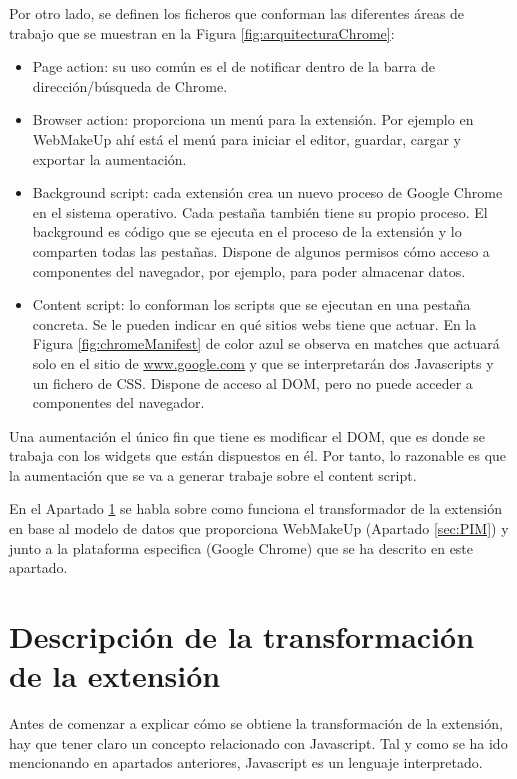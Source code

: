 Por otro lado, se definen los ficheros que conforman las diferentes áreas de trabajo que se muestran en la Figura \ref{fig:arquitecturaChrome}:
\begin{itemize}
\item{Page action: su uso común es el de notificar dentro de la barra de dirección/búsqueda de Chrome.}
\item{Browser action: proporciona un menú para la extensión. Por ejemplo en WebMakeUp ahí está el menú para iniciar el editor, guardar, cargar y exportar la aumentación.}
\item{Background script: cada extensión crea un nuevo proceso de Google Chrome en el sistema operativo. Cada pestaña también tiene su propio proceso. El background es código que se ejecuta en el proceso de la extensión y lo comparten todas las pestañas. Dispone de algunos permisos cómo acceso a componentes del navegador, por ejemplo, para poder almacenar datos.}
\item{Content script: lo conforman los scripts que se ejecutan en una pestaña concreta. Se le pueden indicar en qué sitios webs tiene que actuar. En la Figura \ref{fig:chromeManifest} de color azul se observa en matches que actuará solo en el sitio de \url{www.google.com} y que se interpretarán dos Javascripts y un fichero de CSS. Dispone de acceso al DOM, pero no puede acceder a componentes del navegador.}
\end{itemize}

Una aumentación el único fin que tiene es modificar el DOM, que es donde se trabaja con los widgets que están dispuestos en él. Por tanto, lo razonable es que la aumentación que se va a generar trabaje sobre el content script.

En el Apartado \ref{sec:DescripcionGenerador} se habla sobre como funciona el transformador de la extensión en base al modelo de datos que proporciona WebMakeUp (Apartado \ref{sec:PIM}) y junto a la plataforma especifica (Google Chrome) que se ha descrito en este apartado.

\section{Descripción de la transformación de la extensión}
\label{sec:DescripcionGenerador}

Antes de comenzar a explicar cómo se obtiene la transformación de la extensión, hay que tener claro un concepto relacionado con Javascript. Tal y como se ha ido mencionando en apartados anteriores, Javascript es un lenguaje interpretado.

